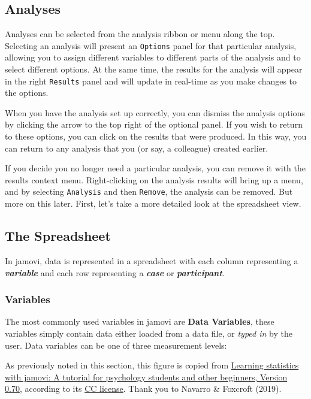 \documentclass[
]{book}
\begin{document}
\hypertarget{analyses}{%
\subsection{Analyses}\label{analyses}}

Analyses can be selected from the analysis ribbon or menu along the top. Selecting an analysis will present an \texttt{Options} panel for that particular analysis, allowing you to assign different variables to different parts of the analysis and to select different options. At the same time, the results for the analysis will appear in the right \texttt{Results} panel and will update in real-time as you make changes to the options.

When you have the analysis set up correctly, you can dismiss the analysis options by clicking the arrow to the top right of the optional panel. If you wish to return to these options, you can click on the results that were produced. In this way, you can return to any analysis that you (or say, a colleague) created earlier.

If you decide you no longer need a particular analysis, you can remove it with the results context menu. Right-clicking on the analysis results will bring up a menu, and by selecting \texttt{Analysis} and then \texttt{Remove}, the analysis can be removed. But more on this later. First, let's take a more detailed look at the spreadsheet view.

\hypertarget{the-spreadsheet}{%
\subsection{The Spreadsheet}\label{the-spreadsheet}}

In jamovi, data is represented in a spreadsheet with each column representing a \textbf{\emph{variable}} and each row representing a \textbf{\emph{case}} or \textbf{\emph{participant}}.

\hypertarget{variables}{%
\subsubsection{Variables}\label{variables}}

The most commonly used variables in jamovi are \textbf{Data Variables}, these variables simply contain data either loaded from a data file, or \emph{typed in} by the user. Data variables can be one of three measurement levels:

As previously noted in this section, this figure is copied from \href{https://www.learnstatswithjamovi.com/}{Learning statistics with jamovi: A tutorial for psychology students and other beginners, Version 0.70}, according to its \href{https://creativecommons.org/licenses/by-sa/4.0/deed.ast}{CC license}. Thank you to Navarro \& Foxcroft (2019).
\end{document}
